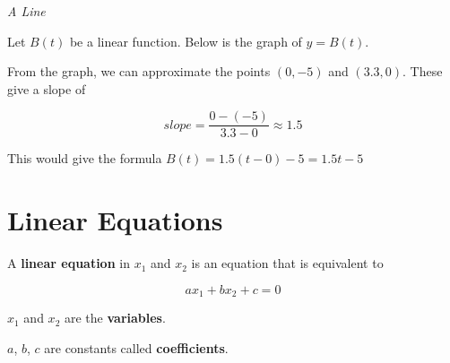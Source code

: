 \documentclass{ximera}
\begin{document}
\begin{example} \textit{A Line}


Let $B(t)$ be a linear function.    Below is the graph of $y = B(t)$.


\begin{image}
\end{image}



From the graph, we can approximate the points $(0, -5)$ and $(3.3, 0)$.  These give a slope of

\[  slope = \frac{0 - (-5)}{3.3 - 0} \approx 1.5     \]


This would give the formula $B(t) = 1.5 (t - 0) - 5 = 1.5 t - 5$


\end{example}

















\section{Linear Equations}


\begin{definition}


A \textbf{linear equation} in $x_1$ and $x_2$ is an equation that is equivalent to 

\[
a x_1 + b x_2 + c = 0
\]


$x_1$ and $x_2$ are the \textbf{variables}.

$a$, $b$, $c$ are constants called \textbf{coefficients}.



\end{definition}
\end{document}
